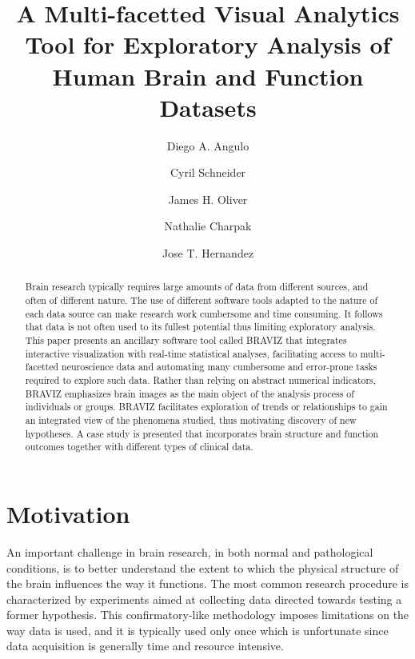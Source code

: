 \documentclass[twocolumn]{svjour3}
\begin{document}
\title{A Multi-facetted Visual Analytics Tool for Exploratory Analysis of Human Brain and Function Datasets} 

\author{Diego A. Angulo \and Cyril Schneider \and James H. Oliver  \and Nathalie Charpak \and Jose T. Hernandez}



\maketitle


\begin{abstract}
Brain research typically requires large amounts of data from different sources, and often of different nature. The use of different software tools adapted to the nature of each data source can make research work cumbersome and time consuming. It follows that data is not often used to its fullest potential thus limiting exploratory analysis. This paper presents an ancillary software tool called BRAVIZ that integrates interactive visualization with real-time statistical analyses, facilitating access to multi-facetted neuroscience data and automating many cumbersome and error-prone tasks required to explore such data. Rather than relying on abstract numerical indicators, BRAVIZ emphasizes brain images as the main object of the analysis process of individuals or groups. BRAVIZ facilitates exploration of trends or relationships to gain an integrated view of the phenomena studied, thus motivating discovery of new hypotheses. A case study is presented that incorporates brain structure and function outcomes together with different types of clinical data.

\end{abstract}

\section{Motivation}


An important challenge in brain research, in both normal and pathological conditions, is to better understand the extent to which the physical structure of the brain influences the way it functions. The most common research procedure is characterized by experiments aimed at collecting data directed towards testing a former hypothesis. This confirmatory-like methodology imposes limitations on the way data is used, and it is typically used only once which is unfortunate since data acquisition is generally time and resource intensive.
\end{document}
